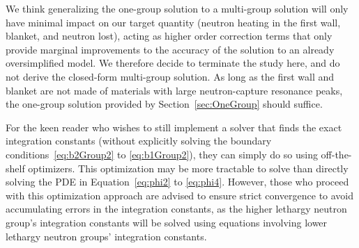\documentclass[a4paper, 12pt]{article}
\begin{document}
We think generalizing the one-group solution to a multi-group solution will only have minimal impact on our target quantity (neutron heating in the first wall, blanket, and neutron lost), acting as higher order correction terms that only provide marginal improvements to the accuracy of the solution to an already oversimplified model. We therefore decide to terminate the study here, and do not derive the closed-form multi-group solution.
As long as the first wall and blanket are not made of materials with large neutron-capture resonance peaks, the one-group solution provided by Section~\ref{sec:OneGroup} should suffice.

For the keen reader who wishes to still implement a solver that finds the exact integration constants (without explicitly solving the boundary conditions~\ref{eq:b2Group2} to \ref{eq:b1Group2}), they can simply do so using off-the-shelf optimizers. This optimization may be more tractable to solve than directly solving the PDE in Equation~\ref{eq:phi2} to \ref{eq:phi4}.
However, those who proceed with this optimization approach are advised to ensure strict convergence to avoid accumulating errors in the integration constants, as the higher lethargy neutron group's integration constants will be solved using equations involving lower lethargy neutron groups' integration constants.



\end{document}
